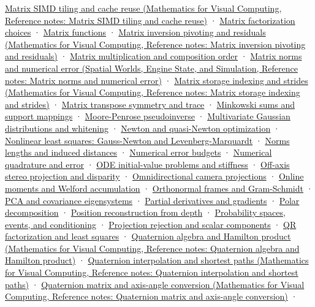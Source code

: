 \href{../02-Mathematics-for-Visual-Computing/main.pdf\#nameddest=appendix-1bfb7c657105}{Matrix SIMD tiling and cache reuse (Mathematics for Visual Computing, Reference notes: Matrix SIMD tiling and cache reuse)} · \hyperref[appendix-221a483bec2d]{Matrix factorization choices} · \hyperref[appendix-0f4bc2bf2b1f]{Matrix functions} · \href{../02-Mathematics-for-Visual-Computing/main.pdf\#nameddest=appendix-48d2e66378ab}{Matrix inversion pivoting and residuals (Mathematics for Visual Computing, Reference notes: Matrix inversion pivoting and residuals)} · \hyperref[appendix-ab31ef447dbf]{Matrix multiplication and composition order} · \href{../05-Spatial-Worlds-Engine-State-and-Simulation/main.pdf\#nameddest=appendix-f8657bac66e5}{Matrix norms and numerical error (Spatial Worlds, Engine State, and Simulation, Reference notes: Matrix norms and numerical error)} · \href{../02-Mathematics-for-Visual-Computing/main.pdf\#nameddest=appendix-ffdc1d4e5350}{Matrix storage indexing and strides (Mathematics for Visual Computing, Reference notes: Matrix storage indexing and strides)} · \hyperref[appendix-175ca5ff874d]{Matrix transpose symmetry and trace} · \hyperref[appendix-215ac7099a82]{Minkowski sums and support mappings} · \hyperref[appendix-541306fdbc1b]{Moore-Penrose pseudoinverse} · \hyperref[appendix-12bbe185dbe5]{Multivariate Gaussian distributions and whitening} · \hyperref[appendix-54c8f5828387]{Newton and quasi-Newton optimization} · \hyperref[appendix-2c2df8345991]{Nonlinear least squares: Gauss-Newton and Levenberg-Marquardt} · \hyperref[appendix-49933872bb51]{Norms lengths and induced distances} · \hyperref[appendix-31b8c295e05f]{Numerical error budgets} · \hyperref[appendix-80521eae6b71]{Numerical quadrature and error} · \hyperref[appendix-e8ab9836882e]{ODE initial-value problems and stiffness} · \hyperref[appendix-0976e86e5b9f]{Off-axis stereo projection and disparity} · \hyperref[appendix-fc99ad39f351]{Omnidirectional camera projections} · \hyperref[appendix-33237f0f618b]{Online moments and Welford accumulation} · \hyperref[appendix-c39f1ed34271]{Orthonormal frames and Gram-Schmidt} · \hyperref[appendix-ad175ef3c5bf]{PCA and covariance eigensystems} · \hyperref[appendix-677b59746ae0]{Partial derivatives and gradients} · \hyperref[appendix-73f5bcf7a462]{Polar decomposition} · \hyperref[appendix-2cbf2968e866]{Position reconstruction from depth} · \hyperref[appendix-f1ef323f6ed7]{Probability spaces, events, and conditioning} · \hyperref[appendix-505a502c372a]{Projection rejection and scalar components} · \hyperref[appendix-c3421e6b4f2c]{QR factorization and least squares} · \href{../02-Mathematics-for-Visual-Computing/main.pdf\#nameddest=appendix-965d9260eeab}{Quaternion algebra and Hamilton product (Mathematics for Visual Computing, Reference notes: Quaternion algebra and Hamilton product)} · \href{../02-Mathematics-for-Visual-Computing/main.pdf\#nameddest=appendix-9b4b8254f26b}{Quaternion interpolation and shortest paths (Mathematics for Visual Computing, Reference notes: Quaternion interpolation and shortest paths)} · \href{../02-Mathematics-for-Visual-Computing/main.pdf\#nameddest=appendix-26d8da71f6c4}{Quaternion matrix and axis-angle conversion (Mathematics for Visual Computing, Reference notes: Quaternion matrix and axis-angle conversion)} · 